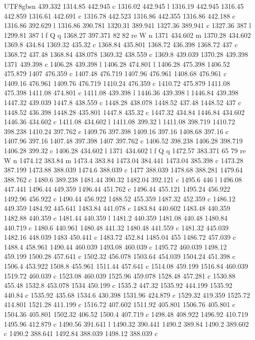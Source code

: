 \documentclass[11pt,a4paper,oneside]{report}
\begin{document}
\begin{CJK*}{UTF8}{gbsn}
{439.332 1314.85 442.945 c 1316.02 442.945 l 1316.19 442.945 1316.45 442.859 1316.61 442.691 c 1316.78
442.523 1316.86 442.355 1316.86 442.188 c 1316.86 392.629 l 1316.86 390.781 1320.31 389.941 1327.36
389.941 c 1327.36 387 l 1299.81 387 l f Q q 1368.27 397.371 82 82 re W n 1371 434.602 m 1370.28 434.602
1369.8 434.84 1369.32 435.32 c 1368.84 435.801 1368.72 436.398 1368.72 437 c 1368.72 437.48 1368.84
438.078 1369.32 438.559 c 1369.8 439.039 1370.28 439.398 1371 439.398 c 1406.28 439.398 l 1406.28 474.801
l 1406.28 475.398 1406.52 475.879 1407 476.359 c 1407.48 476.719 1407.96 476.961 1408.68 476.961 c
1409.16 476.961 1409.76 476.719 1410.24 476.359 c 1410.72 475.879 1411.08 475.398 1411.08 474.801 c
1411.08 439.398 l 1446.36 439.398 l 1446.84 439.398 1447.32 439.039 1447.8 438.559 c 1448.28 438.078
1448.52 437.48 1448.52 437 c 1448.52 436.398 1448.28 435.801 1447.8 435.32 c 1447.32 434.84 1446.84
434.602 1446.36 434.602 c 1411.08 434.602 l 1411.08 399.32 l 1411.08 398.719 1410.72 398.238 1410.24
397.762 c 1409.76 397.398 1409.16 397.16 1408.68 397.16 c 1407.96 397.16 1407.48 397.398 1407 397.762 c
1406.52 398.238 1406.28 398.719 1406.28 399.32 c 1406.28 434.602 l 1371 434.602 l f Q q 1472.57 383.371
65 79 re W n 1474.12 383.84 m 1473.4 383.84 1473.04 384.441 1473.04 385.398 c 1473.28 387.199 1473.88
388.039 1474.6 388.039 c 1477 388.039 1478.68 388.281 1479.64 388.762 c 1480.6 389.238 1481.44 390.32
1482.04 392.121 c 1495.6 446 l 1496.08 447.441 1496.44 449.359 1496.44 451.762 c 1496.44 455.121 1495.24
456.922 1492.96 456.922 c 1490.44 456.922 1488.52 455.359 1487.32 452.359 c 1486.12 449.359 1484.92
445.641 1483.84 441.078 c 1483.84 440.602 1483.48 440.359 1482.88 440.359 c 1481.44 440.359 l 1481.2
440.359 1481.08 440.48 1480.84 440.719 c 1480.6 440.961 1480.48 441.32 1480.48 441.559 c 1481.32 445.039
1482.16 448.039 1483 450.441 c 1483.72 452.84 1485.04 455 1486.72 457.039 c 1488.4 458.961 1490.44
460.039 1493.08 460.039 c 1495.72 460.039 1498.12 459.199 1500.28 457.641 c 1502.32 456.078 1503.64
454.039 1504.24 451.398 c 1506.4 453.922 1508.8 455.961 1511.44 457.641 c 1514.08 459.199 1516.84 460.039
1519.72 460.039 c 1523.08 460.039 1525.96 459.078 1528.48 457.281 c 1530.88 455.48 1532.8 453.078 1534
450.199 c 1535.2 447.32 1535.92 444.199 1535.92 440.84 c 1535.92 435.68 1534.6 430.398 1531.96 424.879 c
1529.32 419.359 1525.72 414.801 1521.28 411.199 c 1516.72 407.602 1511.92 405.801 1506.76 405.801 c
1504.36 405.801 1502.32 406.52 1500.4 407.719 c 1498.48 408.922 1496.92 410.719 1495.96 412.879 c 1490.56
391.641 l 1490.32 390.441 1490.2 389.84 1490.2 389.602 c 1490.2 388.641 1492.84 388.039 1498.12 388.039 c
}
\end{CJK*}
\end{document}
